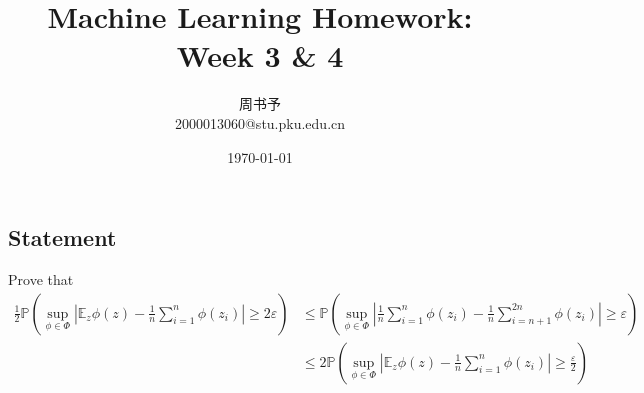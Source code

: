 \documentclass[8pt]{article}
\title{\heiti\zihao{2} Machine Learning Homework: Week 3 \& 4}
\author{\kaishu\zihao{-3} 周书予\\2000013060@stu.pku.edu.cn}
\date{\today}
\theoremstyle{compact}
\def\le{\leqslant}
\def\ge{\geqslant}
\def\P#1{\mathbb{P}\left({#1}\right)}
\begin{document}
\pagestyle{plain}

\maketitle

\section{}
\subsection*{Statement}
Prove that
\begin{equation}
	\begin{split}
		\frac12 \P{\sup_{\phi \in \Phi}\left|\mathbb E_z{\phi(z)} - \frac1n\sum_{i=1}^{n}\phi(z_i)\right| \ge 2\varepsilon} 
		&\le \P{\sup_{\phi \in \Phi}\left|\frac1n\sum_{i=1}^{n}\phi(z_i) - \frac1n\sum_{i=n+1}^{2n}\phi(z_i)\right| \ge \varepsilon} \\
		&\le 2\P{\sup_{\phi \in \Phi}\left|\mathbb E_z{\phi(z)} - \frac1n\sum_{i=1}^{n}\phi(z_i)\right| \ge \frac{\varepsilon}{2}}
	\end{split}
\end{equation}
\end{document}
